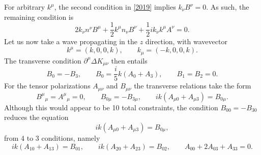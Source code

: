 \documentclass[10pt,letterpaper]{article}
\begin{document}
For arbitrary $k^\mu$, the second condition in \ref{2019} implies $k_\nu B^\nu = 0$. As such, the remaining condition is
\begin{equation}
2k_\nu n^\nu B^\mu + \frac12 k^\mu n_\nu B^\nu + \frac12 i k_\nu k^\mu A^\nu = 0.
\end{equation}
Let us now take a wave propagating in the $z$ direction, with wavevector
\begin{equation}
k^\mu = (k,0,0,k),\qquad k_\mu = (-k,0,0,k).
\end{equation}
The transverse condition $\partial^\mu \Delta K_{\mu\nu}$ then entails
\begin{equation}
B_0 = -B_3,\qquad B_0 = \frac{i}{5}k(A_0+A_3),\qquad B_1 = B_2 = 0.
\end{equation}
For the tensor polarizations $A_{\mu\nu}$ and $B_{\mu\nu}$ the transverse relations take the form
\begin{equation}
B^\mu{}_\mu = A^\mu{}_\mu = 0,\qquad B_{0\mu} = -B_{3\mu},\qquad ik(A_{\mu 0}+ A_{\mu 3}) = B_{0\mu}.
\end{equation}
Although this would appear to be 10 total constraints, the condition $B_{00} = -B_{30}$ reduces the equation
\begin{equation}
ik(A_{\mu0}+A_{\mu 3}) = B_{0\mu},
\end{equation}
from 4 to 3 conditions, namely
\begin{equation}
ik(A_{10}+A_{13}) = B_{01},\qquad ik(A_{20}+A_{23}) = B_{02},\qquad A_{00} + 2A_{03} + A_{33} = 0.
\end{equation}
\end{document}
